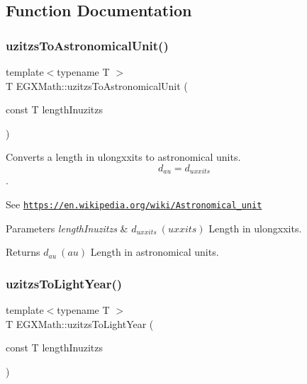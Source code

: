 \subsection{Function Documentation}
\mbox{\label{group___e_g_x_math-_conversions-_length_conversions-uzitzs-_astronomical_ga5b92a4634ad3e80173c05bc3ff39f079}} 
\subsubsection{\texorpdfstring{uzitzs\+To\+Astronomical\+Unit()}{uzitzsToAstronomicalUnit()}}
{\footnotesize\ttfamily template$<$typename T $>$ \\
T E\+G\+X\+Math\+::uzitzs\+To\+Astronomical\+Unit (\begin{DoxyParamCaption}\item[{const T}]{length\+Inuzitzs }\end{DoxyParamCaption})}



Converts a length in ulongxxits to astronomical units. \[ d_{au}=d_{uxxits} \]. 

See \href{https://en.wikipedia.org/wiki/Astronomical_unit}{\tt https\+://en.\+wikipedia.\+org/wiki/\+Astronomical\+\_\+unit} 
\begin{DoxyParams}{Parameters}
{\em length\+Inuzitzs} & $ d_{uxxits}\ (uxxits)$ Length in ulongxxits. \\
\hline
\end{DoxyParams}
\begin{DoxyReturn}{Returns}
$ d_{au}\ (au)$ Length in astronomical units. 
\end{DoxyReturn}
\mbox{\label{group___e_g_x_math-_conversions-_length_conversions-uzitzs-_astronomical_gaa6ada41d9c8a7516cb5fe8ab01976b27}} 
\subsubsection{\texorpdfstring{uzitzs\+To\+Light\+Year()}{uzitzsToLightYear()}}
{\footnotesize\ttfamily template$<$typename T $>$ \\
T E\+G\+X\+Math\+::uzitzs\+To\+Light\+Year (\begin{DoxyParamCaption}\item[{const T}]{length\+Inuzitzs }\end{DoxyParamCaption})}



